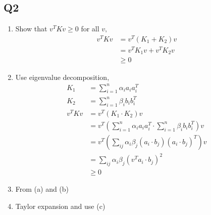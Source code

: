 \documentclass{article}
\begin{document}
\subsection{Q2}
\begin{enumerate}
\item Show that $v^{T} K v \geq  0$ for all $v, $
\begin{align*}
v^{T} K v &= v^{T} \left(K_{1} + K_{2}\right) v
\\ &= v^{T} K_{1} v + v^{T} K_{2} v
\\ &\geq  0
\end{align*}
\item Use eigenvalue decomposition,
\begin{align*}
K_{1} &= \displaystyle\sum_{i=1}^{n} \alpha_{i} a_{i} a_{i}^{T}
\\ K_{2} &= \displaystyle\sum_{i=1}^{n} \beta_{i} b_{i} b_{i}^{T}
\\ v^{T} K v &= v^{T} \left(K_{1} \cdot  K_{2}\right) v 
\\ &= v^{T} \left(\displaystyle\sum_{i=1}^{n} \alpha_{i} a_{i} a_{i}^{T} \cdot  \displaystyle\sum_{i=1}^{n} \beta_{i} b_{i} b_{i}^{T}\right) v 
\\ &= v^{T} \left(\displaystyle\sum_{ij} \alpha_{i} \beta_{j} \left(a_{i} \cdot  b_{j}\right) \left(a_{i} \cdot  b_{j}\right)^{T}\right) v 
\\ &= \displaystyle\sum_{ij} \alpha_{i} \beta_{j} \left(v^{T} a_{i} \cdot  b_{j}\right)^{2}
\\ &\geq  0
\end{align*}
\item From (a) and (b)
\end{enumerate}

\begin{enumerate}
\setcounter{enumii}{3}
\item Taylor expansion and use (c)
\end{enumerate}
\end{document}
